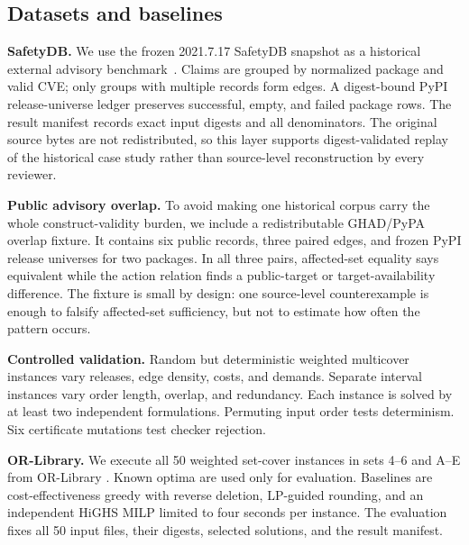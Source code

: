 \documentclass[10pt,conference]{IEEEtran}
\begin{document}
\subsection{Datasets and baselines}
\textbf{SafetyDB.} We use the frozen 2021.7.17 SafetyDB snapshot as a historical external advisory benchmark~\cite{safetydb}. Claims are grouped by normalized package and valid CVE; only groups with multiple records form edges. A digest-bound PyPI release-universe ledger preserves successful, empty, and failed package rows. The result manifest records exact input digests and all denominators. The original source bytes are not redistributed, so this layer supports digest-validated replay of the historical case study rather than source-level reconstruction by every reviewer.

\textbf{Public advisory overlap.} To avoid making one historical corpus carry the whole construct-validity burden, we include a redistributable GHAD/PyPA overlap fixture. It contains six public records, three paired edges, and frozen PyPI release universes for two packages. In all three pairs, affected-set equality says equivalent while the action relation finds a public-target or target-availability difference. The fixture is small by design: one source-level counterexample is enough to falsify affected-set sufficiency, but not to estimate how often the pattern occurs.

\textbf{Controlled validation.} Random but deterministic weighted multicover instances vary releases, edge density, costs, and demands. Separate interval instances vary order length, overlap, and redundancy. Each instance is solved by at least two independent formulations. Permuting input order tests determinism. Six certificate mutations test checker rejection.

\textbf{OR-Library.} We execute all 50 weighted set-cover instances in sets 4--6 and A--E from OR-Library \cite{beasley1990orlib}. Known optima are used only for evaluation. Baselines are cost-effectiveness greedy with reverse deletion, LP-guided rounding, and an independent HiGHS MILP limited to four seconds per instance. The evaluation fixes all 50 input files, their digests, selected solutions, and the result manifest.
\end{document}
